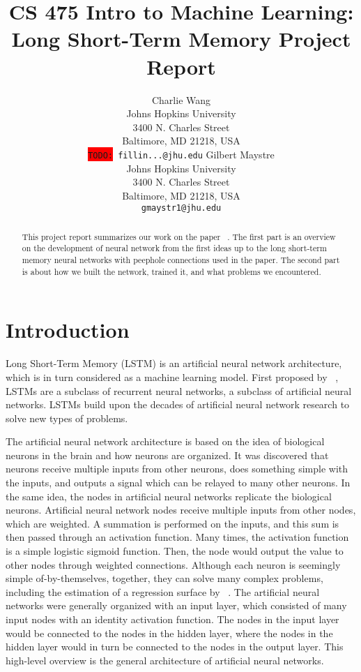 \documentclass[11pt,letterpaper]{article}
\title{CS 475 Intro to Machine Learning: Long Short-Term Memory Project Report}
\author{Charlie Wang\\
  Johns Hopkins University\\
  3400 N. Charles Street\\
  Baltimore, MD 21218, USA\\
  {\tt \colorbox{red}{TODO:} fillin...@jhu.edu}
  \And
  Gilbert Maystre \\
  Johns Hopkins University\\
  3400 N. Charles Street\\
  Baltimore, MD 21218, USA\\
  {\tt gmaystr1@jhu.edu}}
\date{}
\begin{document}
\maketitle

\begin{abstract}
This project report summarizes our work on the paper ~\cite{Gers:01}. The first part is an overview on the development of neural network from the first ideas up to the long short-term memory neural networks with peephole connections used in the paper. The second part is about how we built the network, trained it, and what problems we encountered. 
\end{abstract}

\section{Introduction}

Long Short-Term Memory (LSTM) is an artificial neural network architecture, which is in turn considered as a machine learning model. First proposed by ~\cite{Hochreiter:97}, LSTMs are a subclass of recurrent neural networks, a subclass of artificial neural networks. LSTMs build upon the decades of artificial neural network research to solve new types of problems.

The artificial neural network architecture is based on the idea of biological neurons in the brain and how neurons are organized. It was discovered that neurons receive multiple inputs from other neurons, does something simple with the inputs, and outputs a signal which can be relayed to many other neurons. In the same idea, the nodes in artificial neural networks replicate the biological neurons. Artificial neural network nodes receive multiple inputs from other nodes, which are weighted. A summation is performed on the inputs, and this sum is then passed through an activation function. Many times, the activation function is a simple logistic sigmoid function. Then, the node would output the value to other nodes through weighted connections. Although each neuron is seemingly simple of-by-themselves, together, they can solve many complex problems, including the estimation of a regression surface by ~\cite{Specht:91}. The artificial neural networks were generally organized with an input layer, which consisted of many input nodes with an identity activation function. The nodes in the input layer would be connected to the nodes in the hidden layer, where the nodes in the hidden layer would in turn be connected to the nodes in the output layer. This high-level overview is the general architecture of artificial neural networks. 
 
\end{document}
